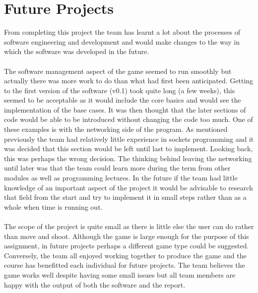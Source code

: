 \section{Future Projects}
\label{sec: future}
From completing this project the team has learnt a lot about the processes of software engineering and development and would make changes to the way in which the software was developed in the future.\\\\
The software management aspect of the game seemed to run smoothly but actually there was more work to do than what had first been anticipated. Getting to the first version of the software (v0.1) took quite long (a few weeks), this seemed to be acceptable as it would include the core basics and would see the implementation of the base cases. It was then thought that the later sections of code would be able to be introduced without changing the code too much. One of these examples is with the networking side of the program. As mentioned previously the team had relatively little experience in sockets programming and it was decided that this section would be left until last to implement. Looking back, this was perhaps the wrong decision. The thinking behind leaving the networking until later was that the team could learn more during the term from other modules as well as programming lectures. In the future if the team had little knowledge of an important aspect of the project it would be advisable to research that field from the start and try to implement it in small steps rather than as a whole when time is running out.\\\\
The scope of the project is quite small as there is little else the user can do rather than move and shoot. Although the game is large enough for the purpose of this assignment, in future projects perhaps a different game type could be suggested. Conversely, the team all enjoyed working together to produce the game and the course has benefitted each individual for future projects. The team believes the game works well despite having some small issues but all team members are happy with the output of both the software and the report.